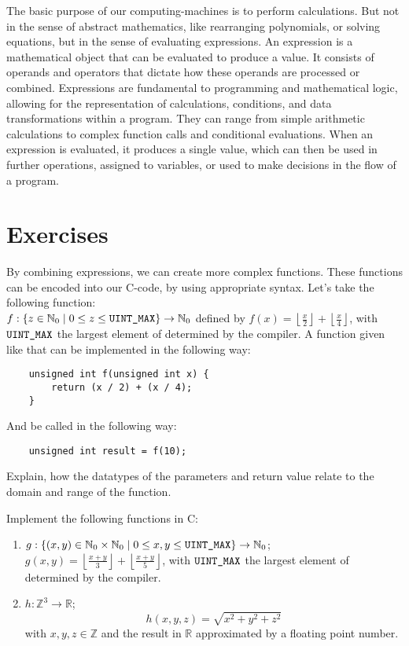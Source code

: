 \documentclass{dcbl/challenge}
\begin{document}
The basic purpose of our computing-machines is to perform calculations.
But not in the sense of abstract mathematics, like rearranging polynomials, or solving equations, but in the sense of evaluating expressions.
An expression is a mathematical object that can be evaluated to produce a value. 
It consists of operands and operators that dictate how these operands are processed or combined. 
Expressions are fundamental to programming and mathematical logic, allowing for the representation of calculations, conditions, and data transformations within a program. They can range from simple arithmetic calculations to complex function calls and conditional evaluations. 
When an expression is evaluated, it produces a single value, which can then be used in further operations, assigned to variables, or used to make decisions in the flow of a program.


\section*{Exercises}
\begin{aufgabe}
    By combining expressions, we can create more complex functions.
    These functions can be encoded into our C-code, by using appropriate syntax.
    Let's take the following function:\\
    \(f: \{z \in \mathbb{N}_0 \mid 0 \leq z \leq \text{{\texttt{UINT\_MAX}}}\} \rightarrow \mathbb{N}_0\) defined by \(f(x) = \left\lfloor \frac{x}{2} \right\rfloor + \left\lfloor \frac{x}{4} \right\rfloor\), with \(\text{{\texttt{UINT\_MAX}}}\) the largest element of  determined by the compiler.
    A function given like that can be implemented in the following way:
    \begin{lstlisting}
    unsigned int f(unsigned int x) {
        return (x / 2) + (x / 4);
    }
    \end{lstlisting}
    And be called in the following way:
    \begin{lstlisting}
    unsigned int result = f(10);
    \end{lstlisting}
    Explain, how the datatypes of the parameters and return value relate to the domain and range of the function.    
\end{aufgabe}

\begin{aufgabe}
    Implement the following functions in C:
    \begin{enumerate}
        \item \(g: \{ (x, y) \in \mathbb{N}_0 \times \mathbb{N}_0 \mid 0 \leq x, y \leq \text{{\texttt{UINT\_MAX}}}\} \rightarrow \mathbb{N}_0\); \(g(x, y) = \left\lfloor \frac{x + y}{3} \right\rfloor + \left\lfloor \frac{x + y}{5} \right\rfloor\), with \(\text{{\texttt{UINT\_MAX}}}\) the largest element of  determined by the compiler.
        \item \(h: \mathbb{Z}^3 \rightarrow \mathbb{R}\); \[h(x, y, z) = \sqrt{x^2 + y^2 + z^2}\] with \(x, y, z \in \mathbb{Z}\) and the result in \( \mathbb{R} \) approximated by a floating point number.
    \end{enumerate}
\end{aufgabe}
\end{document}
